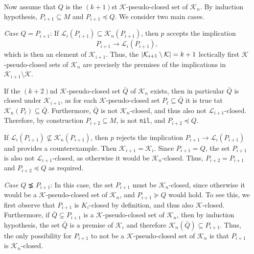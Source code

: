 \begin{Proof}
  Now assume that $Q$ is the $(k+1)$st $\mathcal{K}$-pseudo-closed set of
  $\mathcal{K}_{n}$.  By induction hypothesis, $P_{i+1} \subseteq M$ and $P_{i+1} \preceq
  Q$.  We consider two main cases.

  \textit{Case $Q = P_{i+1}$}:  If $\mathcal{L}_{i}(P_{i+1}) \subseteq
  \mathcal{K}_{n}(P_{i+1})$, then $p$ accepts the implication
  \begin{equation*}
    P_{i+1} \to \mathcal{L}_{i}(P_{i+1}),
  \end{equation*}
  which is then an element of $\mathcal{K}_{i+1}$.  Thus, the $\lvert \mathcal{K}_{i+1}
    \setminus \mathcal{K} \rvert = k + 1$ lectically first $\mathcal{K}$-pseudo-closed sets of
  $\mathcal{K}_{n}$ are precisely the premises of the implications in $\mathcal{K}_{i+1}
  \setminus \mathcal{K}$.

  If the $(k+2)$nd $\mathcal{K}$-pseudo-closed set $\bar Q$ of $\mathcal{K}_{n}$ exists,
  then in particular $\bar Q$ is closed under $\mathcal{K}_{i+1}$, as for each
  $\mathcal{K}$-pseudo-closed set $P_{\ell} \subseteq \bar Q$ it is true tat
  $\mathcal{K}_{n}(P_{\ell}) \subseteq \bar Q$.  Furthermore, $\bar Q$ is not
  $\mathcal{K}_{n}$-closed, and thus also not $\mathcal{L}_{i+1}$-closed.  Therefore, by
  construction $P_{i+2} \subseteq M$, \ie is not \lstinline{nil}, and $P_{i+2} \preceq Q$.

  If $\mathcal{L}_{i}(P_{i+1}) \not\subseteq \mathcal{K}_{n}(P_{i+1})$, then $p$ rejects
  the implication $P_{i+1} \to \mathcal{L}_{i}(P_{i+1})$ and provides a counterexample.
  Then $\mathcal{K}_{i+1} = \mathcal{K}_{i}$.  Since $P_{i+1} = Q$, the set $P_{i+1}$ is
  also not $\mathcal{L}_{i+1}$-closed, as otherwise it would be $\mathcal{K}_{n}$-closed.
  Thus, $P_{i+2} = P_{i+1}$ and $P_{i+2} \preceq Q$ as required.

  \textit{Case $Q \precneq P_{i+1}$}:  In this case, the set $P_{i+1}$ must be
  $\mathcal{K}_{n}$-closed, since otherwise it would be a $\mathcal{K}$-pseudo-closed set
  of $\mathcal{K}_{n}$, and $P_{i+1} \succeq Q$ would hold.  To see this, we first observe
  that $P_{i+1}$ is $K_{i}$-closed by definition, and thus also $\mathcal{K}$-closed.
  Furthermore, if $\bar Q \subsetneq P_{i+1}$ is a $\mathcal{K}$-pseudo-closed set of
  $\mathcal{K}_{n}$, then by induction hypothesis, the set $\bar Q$ is a premise of
  $\mathcal{K}_{i}$ and therefore $\mathcal{K}_{n}(\bar Q) \subseteq P_{i+1}$.  Thus, the
  only possibility for $P_{i+1}$ to not be a $\mathcal{K}$-pseudo-closed set of
  $\mathcal{K}_{n}$ is that $P_{i+1}$ is $\mathcal{K}_{n}$-closed.


\end{Proof}
